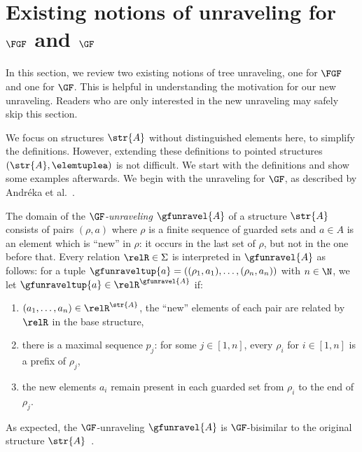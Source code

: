 \section{Existing notions of unraveling for $\FGF$ and $\GF$}\label{sec:existing-unravelings}
In this section, we review two existing notions of tree unraveling, one for $\FGF$ and one for $\GF$.
This is helpful in understanding the motivation for our new unraveling.
Readers who are only interested in the new unraveling may safely skip this section.

We focus on structures $\str{A}$ without distinguished elements here, to simplify the definitions.
However, extending these definitions to pointed structures $(\str{A}, \elemtuplea)$ is not difficult.
We start with the definitions and show some examples afterwards.
We begin with the unraveling for $\GF$, as described by Andréka et al.~\cite[Sec 4.3, p. 247]{AndrekaNB98}.
\begin{definition}[$\GF$-unraveling]
  The domain of the \emph{$\GF$-unraveling} $\gfunravel{A}$ of a structure $\str{A}$ consists of pairs $(\rho, a)$ where $\rho$ is a finite sequence of guarded sets and $a \in A$ is an element which is ``new'' in $\rho$: it occurs in the last set of $\rho$, but not in the one before that.
  Every relation $\relR \in \Sigma$ is interpreted in $\gfunravel{A}$ as follows: for a tuple $\gfunraveltup{a} = ((\rho_{1}, a_{1}), \ldots, (\rho_{n}, a_{n}))$ with $n \in \N$, we let $\gfunraveltup{a} \in \relR^{\gfunravel{A}}$ if:
  \begin{enumerate}
    \item $(a_{1}, \ldots, a_{n}) \in \relR^{\str{A}}$, \ie{} the ``new'' elements of each pair are related by $\relR$ in the base structure,
    \item there is a maximal sequence $p_{j}$: for some $j \in [1,n]$, every $\rho_{i}$ for $i \in [1,n]$ is a prefix of $\rho_{j}$,
    \item the new elements $a_{i}$ remain present in each guarded set from $\rho_{i}$ to the end of $\rho_{j}$.
  \end{enumerate}
\end{definition}
As expected, the $\GF$-unraveling $\gfunravel{A}$ is $\GF$-bisimilar to the original structure $\str{A}$~\cite[Proposition 4.3.1]{AndrekaNB98}.

